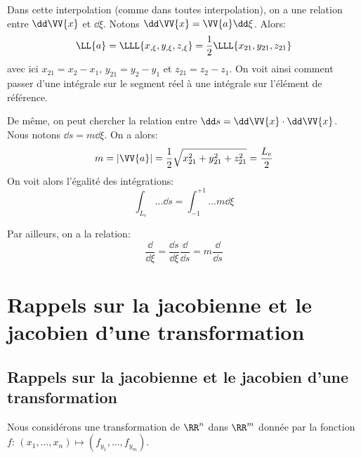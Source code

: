 \medskipvm\fi
Dans cette interpolation (comme dans toutes interpolation), on a une relation entre $\dd\VV{x}$ et
$ \dd \xi$. Notons $\dd\VV{x} = \VV{a}  \dd \xi$. Alors:
\begin{equation} \LL{a} = \LLL{x_{,\xi}, y_{,\xi}, z_{,\xi}} = \frac12 \LLL{x_{21}, y_{21}, z_{21}}\end{equation}
avec ici $x_{21}=x_2-x_1$, $y_{21}=y_2-y_1$ et $z_{21}=z_2-z_1$.
On voit ainsi comment passer d'une intégrale sur le segment réel à une intégrale
sur l'élément de référence.

\medskipvm
De même, on peut chercher la relation entre $\dd s=\dd\VV{x}\cdot\dd\VV{x}$. Nous notons
$\dd s=m  \dd \xi$. On a alors: 
\begin{equation}m=|\VV{a}| = \frac12 \sqrt{x_{21}^2+y_{21}^2+z_{21}^2} = \frac{L_e}2 \end{equation}
On voit alors l'égalité des intégrations:
\begin{equation}\int_{L_e} \ldots \dd s = \int_{-1}^{+1}\ldots m \dd \xi\end{equation}

\medskipvm
Par ailleurs, on a la relation:
\begin{equation} \frac{\dd}{ \dd \xi} = \frac{\dd s}{ \dd \xi}\frac{\dd}{\dd s}=m\frac{\dd}{\dd s}\end{equation}
\medskipvm
\ifVersionAvecExemplesSepares
   \section{Rappels sur la jacobienne et le jacobien d'une transformation}
\else
   \subsection{Rappels sur la jacobienne et le jacobien d'une transformation}
\fi

Nous considérons une transformation de $\RR^n$ dans $\RR^m$ donnée par la fonction $f$: 
$\left(x_1, \ldots, x_n \right) \mapsto \left(f_{y_1}, \ldots, f_{y_m} \right)$.
\ifVersionDuDocEstVincent

